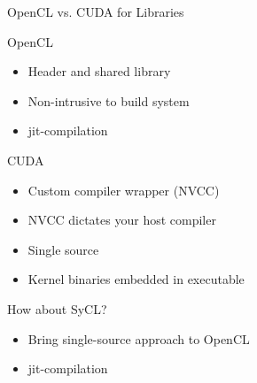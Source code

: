\begin{frame}{OpenCL vs. CUDA for Libraries}

 \begin{block}{OpenCL}
   \begin{itemize}
    \item Header and shared library
    \item Non-intrusive to build system
    \item jit-compilation
   \end{itemize}
 \end{block}

 \begin{block}{CUDA}
   \begin{itemize}
    \item Custom compiler wrapper (NVCC)
    \item NVCC dictates your host compiler
    \item Single source
    \item Kernel binaries embedded in executable
   \end{itemize}
 \end{block}

 \begin{block}{How about SyCL?}
   \begin{itemize}
    \item Bring single-source approach to OpenCL
    \item jit-compilation
   \end{itemize}
 \end{block}

\end{frame}

